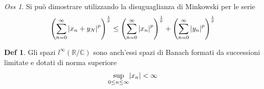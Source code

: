\documentclass[a4paper,11pt]{report}
\theoremstyle{remark}
\newtheorem*{oss}{Oss}
\theoremstyle{definition}
\newtheorem*{Def}{Def}
\newcommand{\C}{\mathbb{C}}
\newcommand{\R}{\mathbb{R}}
\DeclarePairedDelimiter{\abs}{\lvert}{\rvert}
\begin{document}
\begin{oss}
	Si può dimostrare utilizzando la disuguaglianza di Minkowski per le serie 
	\[{\left(\sum_{n=0}^\infty {\abs{x_n+y_N}}^p\right)}^{\frac{1}{p}} \le {\left(\sum_{n=0}^\infty {\abs{x_n}}^p\right)}^{\frac{1}{p}} + {\left(\sum_{n=0}^\infty {\abs{y_n}}^p\right)}^{\frac{1}{p}}\]
\end{oss}

\begin{Def}
	Gli spazi $l^\infty(\R/\C)$ sono anch'essi spazi di Banach formati da successioni limitate e dotati di norma superiore
	\[\sup_{0\le n \le \infty} \abs{x_n} < \infty\]
\end{Def}
\end{document}
